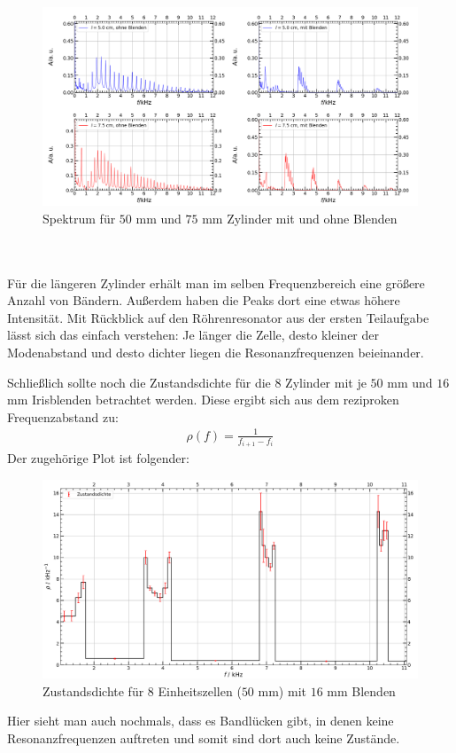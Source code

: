 \documentclass[german,  %
parskip=full,  %
]{scrartcl}
\begin{document}
\\\\
\begin{figure}[h!]
\centering
\includegraphics[width=\textwidth]{4614_und_4615.png}
\caption{Spektrum für $50$ mm und $75$ mm Zylinder mit und ohne Blenden}
\end{figure}
\\\\
Für die längeren Zylinder erhält man im selben Frequenzbereich eine größere Anzahl von Bändern. Außerdem haben die Peaks dort eine etwas höhere Intensität. Mit Rückblick auf den Röhrenresonator aus der ersten Teilaufgabe lässt sich das einfach verstehen: Je länger die Zelle, desto kleiner der Modenabstand und desto dichter liegen die Resonanzfrequenzen beieinander.

Schließlich sollte noch die Zustandsdichte für die 8 Zylinder mit je $50$ mm und $16$ mm Irisblenden betrachtet werden. Diese ergibt sich aus dem reziproken Frequenzabstand zu:
\begin{align}
\rho(f)=\frac{1}{f_{i+1}-f_i}
\end{align}
Der zugehörige Plot ist folgender:
\newpage
\begin{figure}[h!]
\centering
\includegraphics[width=\textwidth]{4614_Zustandsdichte.png}
\caption{Zustandsdichte für 8 Einheitszellen ($50$ mm) mit $16$ mm Blenden}
\end{figure}
Hier sieht man auch nochmals, dass es Bandlücken gibt, in denen keine Resonanzfrequenzen auftreten und somit sind dort auch keine Zustände.
\end{document}
